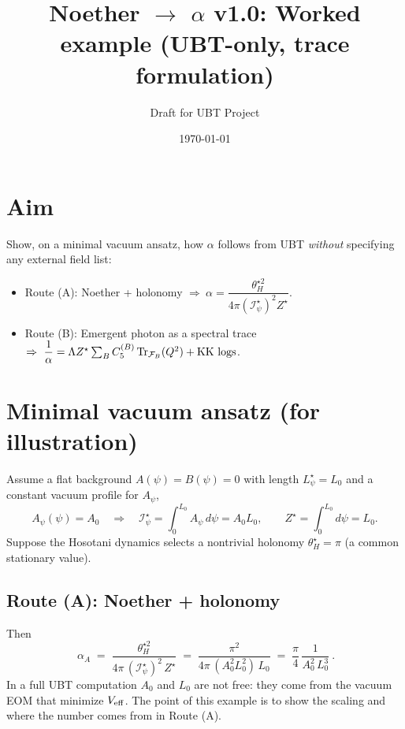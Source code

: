 \documentclass[12pt]{article}
\title{Noether $\to$ $\alpha$ v1.0: Worked example (UBT-only, trace formulation)}
\author{Draft for UBT Project}
\date{\today}
\begin{document}
\maketitle

\section*{Aim}
Show, on a minimal vacuum ansatz, how $\alpha$ follows from UBT \emph{without} specifying any external field list:
\begin{itemize}
\item Route (A): Noether + holonomy $\Rightarrow~ \alpha=\dfrac{\theta_H^{\star 2}}{4\pi(\mathcal I_\psi^\star)^2 Z^\star}$.
\item Route (B): Emergent photon as a spectral trace $\Rightarrow~ \dfrac{1}{\alpha}=\Lambda Z^\star \sum_B C_5^{(B)} \Tr_{\mathcal F_B}(Q^2) + \text{KK logs}$.
\end{itemize}

\section{Minimal vacuum ansatz (for illustration)}
Assume a flat background $A(\psi)=B(\psi)=0$ with length $L_\psi^\star=L_0$ and a constant vacuum profile for $A_\psi$,
\begin{equation}
A_\psi(\psi)=A_0 \quad \Rightarrow \quad \mathcal I_\psi^\star=\int_0^{L_0}\!A_\psi\,d\psi = A_0 L_0,
\qquad
Z^\star=\int_0^{L_0}\! d\psi = L_0.
\end{equation}
Suppose the Hosotani dynamics selects a nontrivial holonomy $\theta_H^\star=\pi$ (a common stationary value).

\subsection*{Route (A): Noether + holonomy}
Then
\begin{equation}
\boxed{~ \alpha_A \;=\; \frac{\theta_H^{\star 2}}{4\pi\,(\mathcal I_\psi^\star)^2\,Z^\star}
\;=\; \frac{\pi^2}{4\pi\,(A_0^2 L_0^2)\,L_0}
\;=\; \frac{\pi}{4}\,\frac{1}{A_0^2\,L_0^3} ~}.
\end{equation}
In a full UBT computation $A_0$ and $L_0$ are not free: they come from the vacuum EOM that minimize $V_{\rm eff}$. The point
of this example is to show the scaling and where the number comes from in Route (A).
\end{document}
